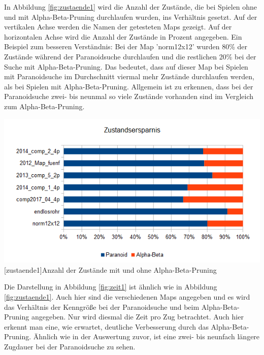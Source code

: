 \documentclass[12pt,a4paper,bibliography=totocnumbered,listof=totocnumbered]{scrartcl}
\begin{document}
    In Abbildung \ref{fig:zustaende1} wird die Anzahl der Zustände, die bei Spielen ohne und mit Alpha-Beta-Pruning durchlaufen wurden, ins Verhältnis gesetzt. Auf der vertikalen Achse werden die Namen der getesteten Maps gezeigt. Auf der horizontalen Achse wird die Anzahl der Zustände in Prozent angegeben. Ein Beispiel zum besseren Verständnis:\newline
    Bei der Map 'norm12x12' wurden 80\% der Zustände während der Paranoidsuche durchlaufen und die restlichen 20\% bei der Suche mit Alpha-Beta-Pruning. Das bedeutet, dass auf dieser Map bei Spielen mit Paranoidsuche im Durchschnitt viermal mehr Zustände durchlaufen werden, als bei Spielen mit Alpha-Beta-Pruning.\newline
    Allgemein ist zu erkennen, dass bei der Paranoidsuche zwei- bis neunmal so viele Zustände vorhanden sind im Vergleich zum Alpha-Beta-Pruning.
    
    \vspace{1em}
    \begin{minipage}{\linewidth}
    	\centering
    	\includegraphics[width=1\linewidth]{pics/Kapitel_4/ZustandParaAlpha.png}
    	[zustaende1]{Anzahl der Zustände mit und ohne Alpha-Beta-Pruning}
    	\label{fig:zustaende1}
    \end{minipage}
    \vspace{1em}
    
    Die Darstellung in Abbildung \ref{fig:zeit1} ist ähnlich wie in Abbildung \ref{fig:zustaende1}. Auch hier sind die verschiedenen Maps angegeben und es wird das Verhältnis der Kenngröße bei der Paranoidsuche und beim Alpha-Beta-Pruning angegeben. Nur wird diesmal die Zeit pro Zug betrachtet.
    Auch hier erkennt man eine, wie erwartet, deutliche Verbesserung durch das Alpha-Beta-Pruning. Ähnlich wie in der Auswertung zuvor, ist eine zwei- bis neunfach längere Zugdauer bei der Paranoidsuche zu sehen.
    
\end{document}
